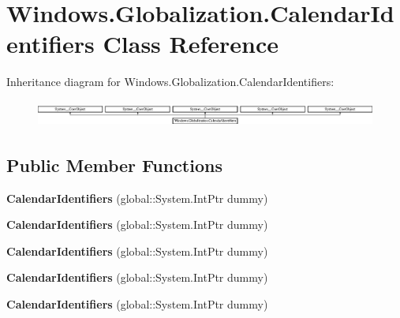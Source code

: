 \hypertarget{class_windows_1_1_globalization_1_1_calendar_identifiers}{}\section{Windows.\+Globalization.\+Calendar\+Identifiers Class Reference}
\label{class_windows_1_1_globalization_1_1_calendar_identifiers}
Inheritance diagram for Windows.\+Globalization.\+Calendar\+Identifiers\+:\begin{figure}[H]
\begin{center}
\leavevmode
\includegraphics[height=0.871595cm]{class_windows_1_1_globalization_1_1_calendar_identifiers}
\end{center}
\end{figure}
\subsection*{Public Member Functions}
\begin{DoxyCompactItemize}
\item 
\mbox{\label{class_windows_1_1_globalization_1_1_calendar_identifiers_ac96b45f87fcb0783f5684b13d608a0f7}} 
{\bfseries Calendar\+Identifiers} (global\+::\+System.\+Int\+Ptr dummy)
\item 
\mbox{\label{class_windows_1_1_globalization_1_1_calendar_identifiers_ac96b45f87fcb0783f5684b13d608a0f7}} 
{\bfseries Calendar\+Identifiers} (global\+::\+System.\+Int\+Ptr dummy)
\item 
\mbox{\label{class_windows_1_1_globalization_1_1_calendar_identifiers_ac96b45f87fcb0783f5684b13d608a0f7}} 
{\bfseries Calendar\+Identifiers} (global\+::\+System.\+Int\+Ptr dummy)
\item 
\mbox{\label{class_windows_1_1_globalization_1_1_calendar_identifiers_ac96b45f87fcb0783f5684b13d608a0f7}} 
{\bfseries Calendar\+Identifiers} (global\+::\+System.\+Int\+Ptr dummy)
\item 
\mbox{\label{class_windows_1_1_globalization_1_1_calendar_identifiers_ac96b45f87fcb0783f5684b13d608a0f7}} 
{\bfseries Calendar\+Identifiers} (global\+::\+System.\+Int\+Ptr dummy)
\end{DoxyCompactItemize}

